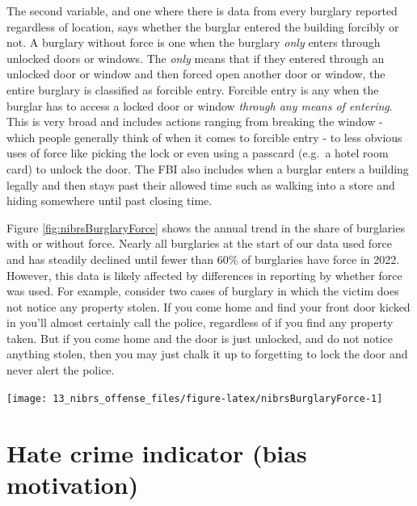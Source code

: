 \documentclass[
]{krantz}
\let\origfigure\figure
\let\endorigfigure\endfigure
\renewenvironment{figure}[1][2] {
    \expandafter\origfigure\expandafter[H]
} {
    \endorigfigure
}
\begin{document}
The second variable, and one where there is data from every
burglary reported regardless of location, says whether the
burglar entered the building forcibly or not. A burglary
without force is one when the burglary \emph{only} enters
through unlocked doors or windows. The \emph{only} means
that if they entered through an unlocked door or window and
then forced open another door or window, the entire burglary
is classified as forcible entry. Forcible entry is any when
the burglar has to access a locked door or window
\emph{through any means of entering}. This is very broad and
includes actions ranging from breaking the window - which
people generally think of when it comes to forcible entry -
to less obvious uses of force like picking the lock or even
using a passcard (e.g.~a hotel room card) to unlock the
door. The FBI also includes when a burglar enters a building
legally and then stays past their allowed time such as
walking into a store and hiding somewhere until past closing
time.

Figure \ref{fig:nibrsBurglaryForce} shows the annual trend
in the share of burglaries with or without force. Nearly all
burglaries at the start of our data used force and has
steadily declined until fewer than 60\% of burglaries have
force in 2022. However, this data is likely affected by
differences in reporting by whether force was used. For
example, consider two cases of burglary in which the victim
does not notice any property stolen. If you come home and
find your front door kicked in you'll almost certainly call
the police, regardless of if you find any property taken.
But if you come home and the door is just unlocked, and do
not notice anything stolen, then you may just chalk it up to
forgetting to lock the door and never alert the police.

\begin{figure}

{\centering \texttt{[image: 13\_nibrs\_offense\_files/figure-latex/nibrsBurglaryForce-1]} 

}

\caption{The annual percent of burglaries, by whether entry used force, 1991-2023.}\label{fig:nibrsBurglaryForce}
\end{figure}

\section{Hate crime indicator (bias
motivation)}\label{hate-crime-indicator-bias-motivation}
\end{document}
